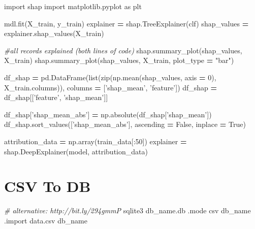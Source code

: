 \documentclass[]{book}
\newenvironment{Shaded}{\begin{snugshade}}{\end{snugshade}}
\newcommand{\BuiltInTok}[1]{#1}
\newcommand{\CommentTok}[1]{\textcolor[rgb]{0.56,0.35,0.01}{\textit{#1}}}
\newcommand{\DecValTok}[1]{\textcolor[rgb]{0.00,0.00,0.81}{#1}}
\newcommand{\ExtensionTok}[1]{#1}
\newcommand{\ImportTok}[1]{#1}
\newcommand{\NormalTok}[1]{#1}
\newcommand{\OperatorTok}[1]{\textcolor[rgb]{0.81,0.36,0.00}{\textbf{#1}}}
\newcommand{\StringTok}[1]{\textcolor[rgb]{0.31,0.60,0.02}{#1}}
\newcommand{\VariableTok}[1]{\textcolor[rgb]{0.00,0.00,0.00}{#1}}
\begin{document}
\begin{Shaded}
\begin{Highlighting}[]
\ImportTok{import}\NormalTok{ shap}
\ImportTok{import}\NormalTok{ matplotlib.pyplot }\ImportTok{as}\NormalTok{ plt}

\NormalTok{mdl.fit(X_train, y_train)}
\NormalTok{explainer }\OperatorTok{=}\NormalTok{ shap.TreeExplainer(clf)}
\NormalTok{shap_values }\OperatorTok{=}\NormalTok{ explainer.shap_values(X_train)}

\CommentTok{#all records explained (both lines of code)}
\NormalTok{shap.summary_plot(shap_values, X_train)}
\NormalTok{shap.summary_plot(shap_values, X_train, plot_type }\OperatorTok{=} \StringTok{"bar"}\NormalTok{)}

\NormalTok{df_shap }\OperatorTok{=}\NormalTok{ pd.DataFrame(}\BuiltInTok{list}\NormalTok{(}\BuiltInTok{zip}\NormalTok{(np.mean(shap_values, axis }\OperatorTok{=} \DecValTok{0}\NormalTok{), X_train.columns)),}
\NormalTok{                       columns }\OperatorTok{=}\NormalTok{ [}\StringTok{'shap_mean'}\NormalTok{, }\StringTok{'feature'}\NormalTok{])}
\NormalTok{df_shap }\OperatorTok{=}\NormalTok{ df_shap[[}\StringTok{'feature'}\NormalTok{, }\StringTok{'shap_mean'}\NormalTok{]]}

\NormalTok{df_shap[}\StringTok{'shap_mean_abs'}\NormalTok{] }\OperatorTok{=}\NormalTok{ np.absolute(df_shap[}\StringTok{'shap_mean'}\NormalTok{])}
\NormalTok{df_shap.sort_values([}\StringTok{'shap_mean_abs'}\NormalTok{], ascending }\OperatorTok{=} \VariableTok{False}\NormalTok{, inplace }\OperatorTok{=} \VariableTok{True}\NormalTok{)}

\NormalTok{attribution_data }\OperatorTok{=}\NormalTok{ np.array(train_data[:}\DecValTok{50}\NormalTok{])}
\NormalTok{explainer }\OperatorTok{=}\NormalTok{ shap.DeepExplainer(model, attribution_data)}
\end{Highlighting}
\end{Shaded}

\hypertarget{csv-to-db}{%
\section{CSV To DB}\label{csv-to-db}}

\begin{Shaded}
\begin{Highlighting}[]
\CommentTok{# alternative: http://bit.ly/294gmmP}
\ExtensionTok{sqlite3}\NormalTok{ db_name.db}
\ExtensionTok{.mode}\NormalTok{ csv db_name}
\ExtensionTok{.import}\NormalTok{ data.csv db_name}
\end{Highlighting}
\end{Shaded}
\end{document}

